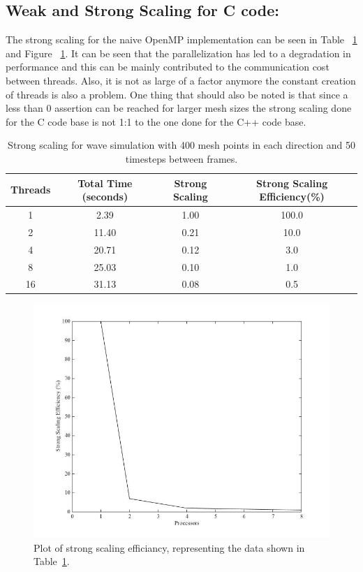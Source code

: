 \documentclass[12pt]{article}
\begin{document}
\subsection{Weak and Strong Scaling for C code:}

The strong scaling for the naive OpenMP implementation can be seen in Table ~\ref{sscale_c} and Figure ~\ref{ssplot_c}. It can be seen that the parallelization has led to a degradation in performance and this can be mainly contributed to the communication cost between threads. Also, it is not as large of a factor anymore the constant creation of threads is also a problem. One thing that should also be noted is that since a less than 0 assertion can be reached for larger mesh sizes the strong scaling done for the C code base is not 1:1 to the one done for the C++ code base.

\begin{table}[h]
	\begin{center}
		\begin{tabular}{|c c c c|}
			\hline
			Threads & Total Time (seconds) & Strong Scaling & Strong Scaling Efficiency(\%) \\ \hline
			1 & 2.39 & 1.00  & 100.0 \\ \hline
			2 & 11.40 & 0.21 &  10.0 \\ \hline
			4 & 20.71 &  0.12&  3.0  \\ \hline
			8 & 25.03 &  0.10&  1.0  \\ \hline
			16 & 31.13 &  0.08& 0.5   \\ \hline
		\end{tabular}
		\caption{Strong scaling for wave simulation with 400 mesh points in each direction and 50 timesteps between frames.}
		\label{sscale_c}
	\end{center}
\end{table}

		\begin{figure}[h]
			\begin{center}
				\includegraphics[width=0.5\columnwidth]{sscale_plot}
				\caption{Plot of strong scaling efficiancy, representing the data shown in Table~\ref{sscale_c}.}
				\label{ssplot_c}
			\end{center}
		\end{figure}
\end{document}
